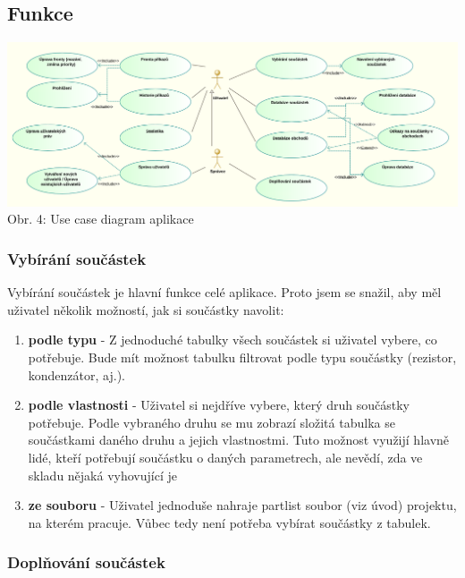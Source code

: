 \documentclass[12pt, a4paper, oneside]{article}
\begin{document}
\subsection{Funkce}

\begin{minipage}{\textwidth}
\begin{center}
\hspace*{-2cm}
\includegraphics[scale=0.69]{img/use_case_uml.png}
\\
\caption{Obr. 4: Use case diagram aplikace}
\end{center}
\end{minipage}
\vspace{4mm}

\subsubsection{Vybírání součástek}

Vybírání součástek je hlavní funkce celé aplikace. Proto jsem se snažil, aby měl uživatel několik možností, jak si součástky navolit:

\begin{enumerate}
\item \textbf{podle typu} - Z jednoduché tabulky všech součástek si uživatel vybere, co potřebuje. Bude mít možnost tabulku filtrovat podle typu součástky (rezistor, kondenzátor, aj.).
\item \textbf{podle vlastnosti} - Uživatel si nejdříve vybere, který druh součástky potřebuje. Podle vybraného druhu se mu zobrazí složitá tabulka se součástkami daného druhu a jejich vlastnostmi. Tuto možnost využijí hlavně lidé, kteří potřebují součástku o daných parametrech, ale nevědí, zda ve skladu nějaká vyhovující je
\item \textbf{ze souboru} - Uživatel jednoduše nahraje partlist soubor (viz úvod) projektu, na kterém pracuje. Vůbec tedy není potřeba vybírat součástky z tabulek.
\end{enumerate}

\subsubsection{Doplňování součástek}
\end{document}
